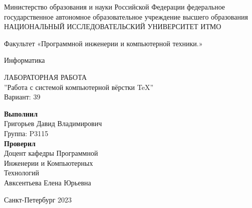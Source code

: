 \begin{center}
	Министерство образования и науки Российской Федерации
	федеральное государственное автономное образовательное учреждение высшего образования
	\\
     {НАЦИОНАЛЬНЫЙ ИССЛЕДОВАТЕЛЬСКИЙ УНИВЕРСИТЕТ ИТМО}
    
    \vspace{2em}
    Факультет «Программной инженерии и компьютерной техники.»

    \vspace{10em}
    
    {\large Информатика}\\
    
    \vspace{2em}
    
    {\large ЛАБОРАТОРНАЯ РАБОТА }
    \\
    {{''Работа с системой компьютерной вёрстки \TeX''}}
    \\
    Вариант: 39
\end{center}
   

\vspace{20em}

\begin{flushright}
    \textbf{Выполнил} \\
    Григорьев Давид Владимирович\\
    Группа: P3115\\
    \textbf{Проверил}\\
    Доцент кафедры Программной\\ Инженерии и Компьютерных\\ Технологий
    \\
    Авксентьева Елена Юрьевна\\
    
\end{flushright}

\vspace{\fill}

\begin{center}
   Санкт-Петербург 2023 
\end{center}
